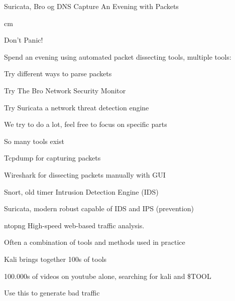 \documentclass[20pt,landscape,a4paper,footrule]{foils}
\begin{document}
\rm
{}
\mytitlepage
{Suricata, Bro og DNS Capture}
{An Evening with Packets}

\LogoOn



 cm

\centerline{\color{titlecolor}\LARGE Don't Panic!}

Spend an evening using automated packet dissecting tools, multiple tools:
\begin{list1}
\item Try different ways to parse packets
\item Try The Bro Network Security Monitor
\item Try Suricata a network threat detection engine
\end{list1}

\centerline{We try to do a lot, feel free to focus on specific parts}


\begin{list1}
\item So many tools exist
\item Tcpdump for capturing packets
\item Wireshark for dissecting packets manually with GUI
\item Snort, old timer Intrusion Detection Engine (IDS)
\item Suricata, modern robust capable of IDS and IPS (prevention)
\item ntopng High-speed web-based traffic analysis.
\end{list1}

\vskip 1cm
\centerline{Often a combination of tools and methods used in practice}



\begin{list1}
\item Kali  brings together 100s of tools
\item 100.000s of videos on youtube alone, searching for kali and \$TOOL
\end{list1}

\vskip 1cm
\centerline{Use this to generate bad traffic}
\end{document}
